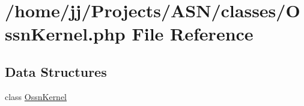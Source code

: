 \hypertarget{_ossn_kernel_8php}{}\section{/home/jj/\+Projects/\+A\+S\+N/classes/\+Ossn\+Kernel.php File Reference}
\label{_ossn_kernel_8php}
\subsection*{Data Structures}
\begin{DoxyCompactItemize}
\item 
class \hyperlink{class_ossn_kernel}{Ossn\+Kernel}
\end{DoxyCompactItemize}
